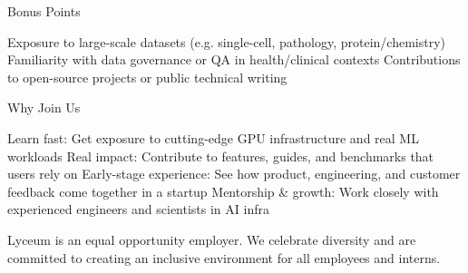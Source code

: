 \documentclass[a4paper,11pt]{article}
\begin{document}
Bonus Points

Exposure to large-scale datasets (e.g. single-cell, pathology, protein/chemistry)
Familiarity with data governance or QA in health/clinical contexts
Contributions to open-source projects or public technical writing


Why Join Us

Learn fast: Get exposure to cutting-edge GPU infrastructure and real ML workloads
Real impact: Contribute to features, guides, and benchmarks that users rely on
Early-stage experience: See how product, engineering, and customer feedback come together in a startup
Mentorship & growth: Work closely with experienced engineers and scientists in AI infra


Lyceum is an equal opportunity employer. We celebrate diversity and are committed to creating an inclusive environment for all employees and interns.
\end{document}
